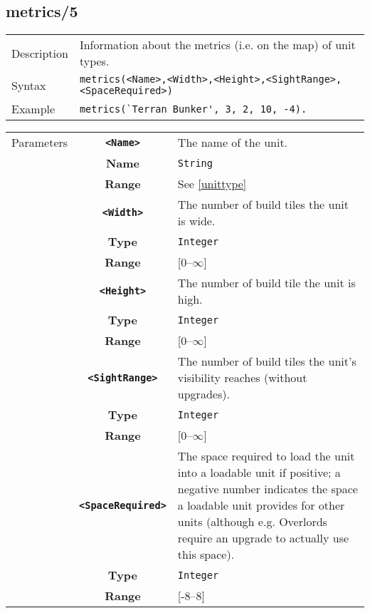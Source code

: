 \subsection{metrics/5}
\begin{tabularx}{\textwidth}{lX}
 Description & Information about the metrics (i.e. on the map) of unit types. \\
 Syntax & \verb|metrics(<Name>,<Width>,<Height>,<SightRange>,<SpaceRequired>)| \\
 Example & \verb|metrics(`Terran Bunker', 3, 2, 10, -4).| \\
 \end{tabularx}
 \begin{tabularx}{\textwidth}{l | c | p{8cm}|}
 \cline{2-3}
 Parameters & \textbf{\verb|<Name>|} & The name of the unit.\\
            & \textbf{Name} & \verb|String| \\
            & \textbf{Range} & See \ref{unittype} \\
            \cline{2-3}
            & \textbf{\verb|<Width>|} & The number of build tiles the unit is wide.\\
            & \textbf{Type} & \verb|Integer| \\
            & \textbf{Range} & [0--$\infty$] \\
            \cline{2-3}
            & \textbf{\verb|<Height>|} & The number of build tile the unit is high.\\
            & \textbf{Type} & \verb|Integer| \\
            & \textbf{Range} & [0--$\infty$] \\
            \cline{2-3}
            & \textbf{\verb|<SightRange>|} & The number of build tiles the unit's visibility reaches (without upgrades). \\
            & \textbf{Type} & \verb|Integer| \\
            & \textbf{Range} & [0--$\infty$] \\
            \cline{2-3}
            & \textbf{\verb|<SpaceRequired>|} & The space required to load the unit into a loadable unit if positive; a negative number indicates the space a loadable unit provides for other units (although e.g. Overlords require an upgrade to actually use this space).\\
            & \textbf{Type} & \verb|Integer| \\
            & \textbf{Range} & [-8--8] \\
            \cline{2-3}
\end{tabularx}

